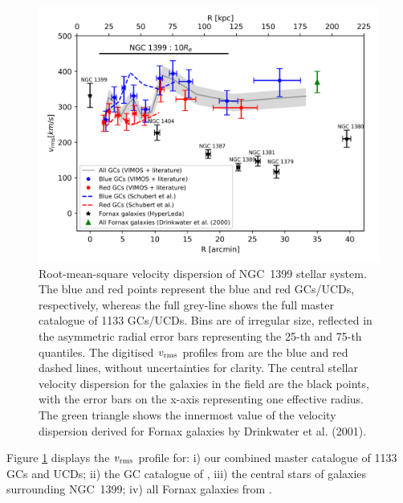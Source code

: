 \documentclass[useAMS,usenatbib]{mn2e}
\begin{document}
\begin{figure}
\centering
\includegraphics[width=\columnwidth]{figures/vrms.png} 
\caption{Root-mean-square velocity dispersion of NGC~1399 stellar system. The blue and red points represent the blue and red GCs/UCDs, respectively, whereas the full grey-line shows the full master catalogue of 1133 GCs/UCDs. Bins are of irregular size, reflected in the asymmetric radial error bars representing the 25-th and 75-th quantiles. The digitised $v_{\rm rms}$ profiles from \citet{Schuberth} are the blue and red dashed lines, without uncertainties for clarity. The central stellar velocity dispersion for the galaxies in the field are the black points, with the error bars on the x-axis representing one effective radius. The green triangle shows the innermost value of the velocity dispersion derived for Fornax galaxies by Drinkwater et al. (2001).}
\label{fig:vrms}
\end{figure}

Figure \ref{fig:vrms} displays the $v_{\rm rms}$ profile for: i) our combined master catalogue of 1133 GCs and UCDs; ii) the GC catalogue of \citet{Schuberth}, iii) the central stars of galaxies surrounding NGC~1399; iv) all Fornax galaxies from \citet{Drinkwater00}. 
\end{document}
